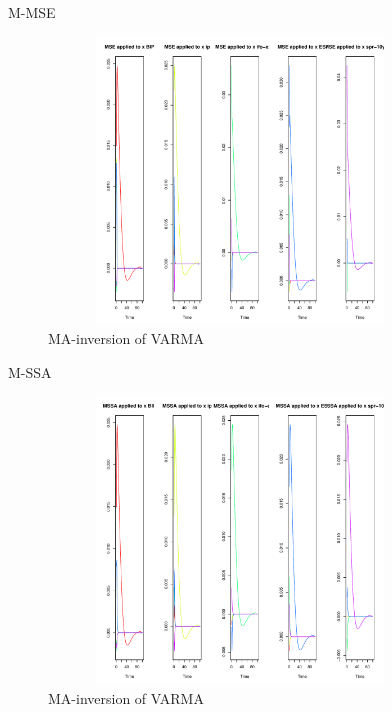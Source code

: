 \documentclass{beamer}
\begin{document}
\begin{frame} {M-MSE}\label{m_mse_p}
\begin{figure}[H]\begin{center}\includegraphics[height=3in, width=4in]{MSE_multi_ip.pdf}\caption{MA-inversion of VARMA\label{cor}}\end{center}\end{figure}\end{frame}

\begin{frame} {M-SSA}\label{m_ssa_p}
\begin{figure}[H]\begin{center}\includegraphics[height=3in, width=4in]{MSSA_multi_ip.pdf}\caption{MA-inversion of VARMA\label{cor}}\end{center}\end{figure}\end{frame}
\end{document}
